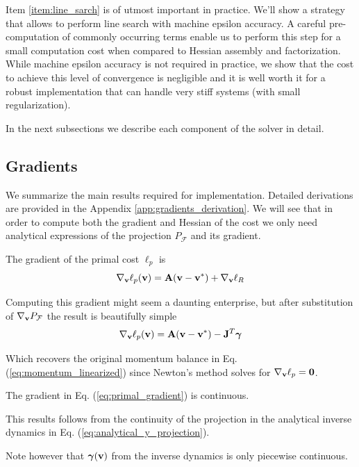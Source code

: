 Item \ref{item:line_sarch} is of utmost important in practice. We'll show a
strategy that allows to perform line search with machine epsilon accuracy. A
careful pre-computation of commonly occurring terms enable us to perform this
step for a small computation cost when compared to Hessian assembly and
factorization. While machine epsilon accuracy is not required in practice, we
show that the cost to achieve this level of convergence is negligible and it is
well worth it for a robust implementation that can handle very stiff systems
(with small regularization).

In the next subsections we describe each component of the solver in detail.

\subsection{Gradients}
\label{sec:gradients}

We summarize the main results required for implementation. Detailed derivations
are provided in the Appendix \ref{app:gradients_derivation}. We will see that in
order to compute both the gradient and Hessian of the cost we only need
analytical expressions of the projection $P_\mathcal{F}$ and its gradient.

The gradient of the primal cost $\ell_p$ is
\begin{equation}
	\nabla_{\mathbf{v}}\ell_p({\mathbf{v}}) = {\mathbf{A}}({\mathbf{v}}-{\mathbf{v}}^*) + \nabla_{\mathbf{v}}\ell_R
\end{equation}

Computing this gradient might seem a daunting enterprise, but after substitution
of $\nabla_{\mathbf{v}}P_\mathcal{F}$ the result is beautifully simple
\begin{equation}
	\nabla_\mf{v}\ell_p(\mf{v}) = \mf{A}(\mf{v}-\mf{v}^*) - \mf{J}^T\bgamma
	\label{eq:primal_gradient}
\end{equation}

Which recovers the original momentum balance in Eq.
(\ref{eq:momentum_linearized}) since Newton's method solves for
$\nabla_{\mathbf{v}}\ell_p={\mathbf{0}}$.

\begin{lemma}
	The gradient in Eq. (\ref{eq:primal_gradient}) is continuous.
\end{lemma}
\begin{IEEEproof}
	This results follows from the continuity of the projection in the analytical
	inverse dynamics in Eq. (\ref{eq:analytical_y_projection}).
\end{IEEEproof}
Note however that ${\bm\gamma}({\mathbf{v}})$ from the inverse dynamics is only piecewise
continuous.

